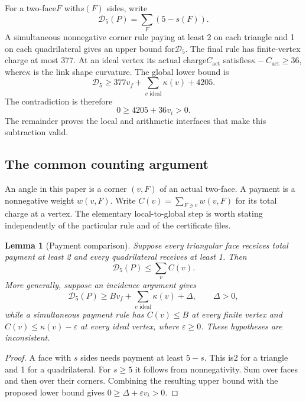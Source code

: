 \documentclass[11pt]{article}
\newtheorem{lemma}[theorem]{Lemma}
\theoremstyle{remark}\newtheorem{remark}[theorem]{Remark}
\newcommand{\Dfive}{\mathcal D_5}
\newcommand{\act}{\mathrm{act}}
\begin{document}
For a two-face$F$ with$s(F)$ sides, write
\[
 \Dfive(P)=\sum_F(5-s(F)).
\]
A simultaneous nonnegative corner rule paying at least 2 on each triangle
and 1 on each quadrilateral gives an upper bound for$\Dfive$. The final
rule has finite-vertex charge at most 377. At an ideal vertex its actual
charge$C_{\act}$ satisfies$\kappa-C_{\act}\ge36$, where$\kappa$ is the
link shape curvature. The global lower bound is
\[
 \Dfive\ge377v_f+\sum_{v\text{ ideal}}\kappa(v)+4205.
\]
The contradiction is therefore
\[
 0\ge4205+36v_i>0.
\]
The remainder proves the local and arithmetic interfaces that make this
subtraction valid.

\subsection{The common counting argument}

An angle in this paper is a corner $(v,F)$ of an actual two-face.
A payment is a nonnegative weight $w(v,F)$. Write
$C(v)=\sum_{F\ni v}w(v,F)$ for its total charge at a vertex.
The elementary local-to-global step is worth stating independently
of the particular rule and of the certificate files.

\begin{lemma}[Payment comparison]\label{lem:payment-comparison}
Suppose every triangular face receives total payment at least 2
and every quadrilateral receives at least 1. Then
\[
 \Dfive(P)\le\sum_v C(v).
\]
More generally, suppose an incidence argument gives
\[
 \Dfive(P)\ge Bv_f+\sum_{v\text{ ideal}}\kappa(v)+\Delta,
 \qquad\Delta>0,
\]
while a simultaneous payment rule has $C(v)\le B$ at every finite
vertex and $C(v)\le\kappa(v)-\varepsilon$ at every ideal vertex,
where $\varepsilon\ge0$. These hypotheses are inconsistent.
\end{lemma}
\begin{proof}
A face with $s$ sides needs payment at least $5-s$. This is2
for a triangle and 1 for a quadrilateral. For $s\ge5$ it follows
from nonnegativity. Sum over faces and then over their corners.
Combining the resulting upper bound with the proposed lower bound
gives $0\ge\Delta+\varepsilon v_i>0$.
\end{proof}
\end{document}
